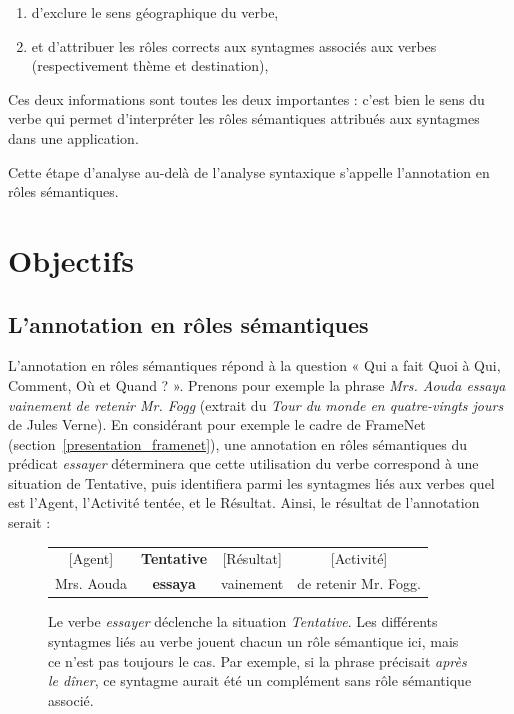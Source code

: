 \begin{enumerate}
    \item d'exclure le sens géographique du verbe,
    \item et d'attribuer les rôles corrects aux syntagmes associés aux verbes
        (respectivement thème et destination),
\end{enumerate}


Ces deux informations sont toutes les deux importantes : c'est bien le sens du
verbe qui permet d'interpréter les rôles sémantiques attribués aux syntagmes
dans une application.

Cette étape d'analyse au-delà de l'analyse syntaxique s'appelle l'annotation en
rôles sémantiques.

\section{Objectifs}

\subsection{L'annotation en rôles sémantiques}

L'annotation en rôles sémantiques répond à la question « Qui a fait Quoi à Qui,
Comment, Où et Quand ? ». Prenons pour exemple la phrase \textit{Mrs. Aouda
essaya vainement de retenir Mr. Fogg} (extrait du \textit{Tour du monde en
quatre-vingts jours} de Jules Verne). En considérant pour exemple le cadre de
FrameNet (section~\ref{presentation_framenet}), une annotation en rôles
sémantiques du prédicat \textit{essayer} déterminera que cette utilisation du
verbe correspond à une situation de Tentative, puis identifiera parmi les
syntagmes liés aux verbes quel est l'Agent, l'Activité tentée, et le Résultat.
Ainsi, le résultat de l'annotation serait :

\begin{figure}[ht]
    \centering
    \begin{tabular}{cccc}
    [Agent]  & \textbf{Tentative} & [Résultat]  & [Activité]         \tabularnewline
    Mrs. Aouda & \textbf{essaya}  & vainement & de retenir Mr. Fogg. \tabularnewline
    \end{tabular}
    \caption{\label{fig:introsrl}Le verbe \textit{essayer} déclenche la situation
        \textit{Tentative}. Les différents syntagmes liés au verbe jouent chacun
        un rôle sémantique ici, mais ce n'est pas toujours le cas. Par exemple,
        si la phrase précisait \textit{après le dîner}, ce syntagme aurait été un
    complément sans rôle sémantique associé.}

\end{figure}

